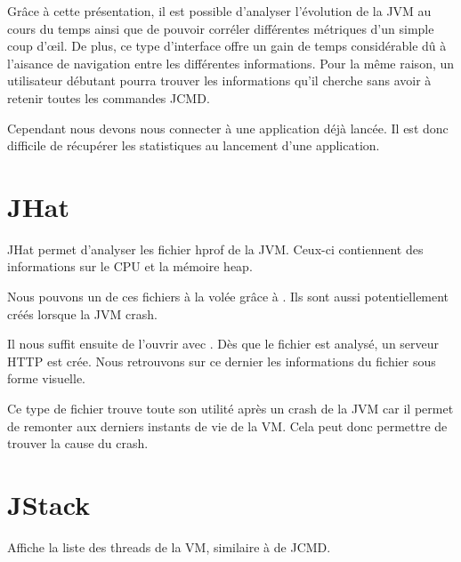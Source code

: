 \documentclass{report}
\begin{document}
			Grâce à cette présentation, il est possible d'analyser l'évolution de la JVM au cours du temps ainsi que de pouvoir corréler différentes métriques d'un simple coup d'\oe il.
			De plus, ce type d'interface offre un gain de temps considérable dû à l'aisance de navigation entre les différentes informations.
			Pour la même raison, un utilisateur débutant pourra trouver les informations qu'il cherche sans avoir à retenir toutes les commandes JCMD.
						
			\begin{figure}[H]
				\begin{minipage}{0.49\textwidth}
				\end{minipage}
				\begin{minipage}{0.49\textwidth}
				\end{minipage}
			\end{figure}
			
			Cependant nous devons nous connecter à une application déjà lancée.
			Il est donc difficile de récupérer les statistiques au lancement d'une application.
			
		\section{JHat}
			JHat permet d'analyser les fichier hprof de la JVM.
			Ceux-ci contiennent des informations sur le CPU et la mémoire heap.
			
			Nous pouvons un de ces fichiers à la volée grâce à .
			Ils sont aussi potentiellement créés lorsque la JVM crash.
			
			Il nous suffit ensuite de l'ouvrir avec .
			Dès que le fichier est analysé, un serveur HTTP est crée.
			Nous retrouvons sur ce dernier les informations du fichier sous forme visuelle.
			
			Ce type de fichier trouve toute son utilité après un crash de la JVM car il permet de remonter aux derniers instants de vie de la VM.
			Cela peut donc permettre de trouver la cause du crash.
			
			
			
		\section{JStack}
			Affiche la liste des threads de la VM, similaire à  de JCMD.
			
\end{document}
